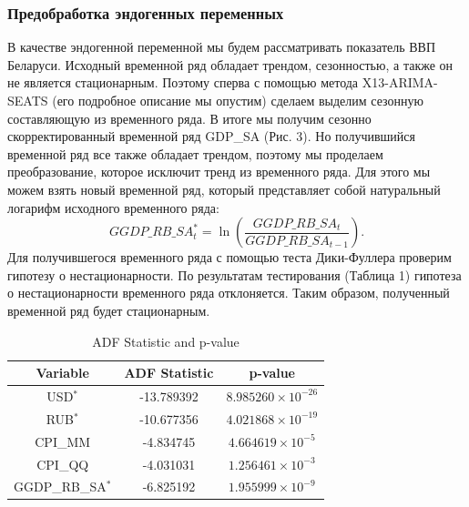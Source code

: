 \documentclass[a4paper, 12pt]{extarticle}
\numberwithin{equation}{subsection}
\begin{document}
	\subsubsection{Предобработка эндогенных переменных}
	В качестве эндогенной переменной мы будем рассматривать показатель ВВП Беларуси. Исходный временной ряд обладает трендом, сезонностью, а также он не является стационарным. Поэтому сперва с помощью метода X13-ARIMA-SEATS (его подробное описание мы опустим) сделаем выделим сезонную составляющую из временного ряда. В итоге мы получим сезонно скорректированный временной ряд GDP\_SA (Рис. 3). Но получившийся временной ряд все также обладает трендом, поэтому мы проделаем преобразование, которое исключит тренд из временного ряда. Для этого мы можем взять новый временной ряд, который представляет собой натуральный логарифм исходного временного ряда:
	\begin{equation}
		GGDP\_RB\_SA_t^* = \ln\left(\dfrac{GGDP\_RB\_SA_t}{GGDP\_RB\_SA_{t-1}}\right).
	\end{equation}
	Для получившегося временного ряда с помощью теста Дики-Фуллера проверим гипотезу о нестационарности. По результатам тестирования (Таблица 1) гипотеза о нестационарности временного ряда отклоняется. Таким образом, полученный временной ряд будет стационарным.
	\begin{table}[]
		\centering
		\caption{ADF Statistic and p-value}
		\label{tab:adf_pvalue}
		\begin{tabular}{|c|c|c|}
			\hline
			Variable   & ADF Statistic & p-value        \\ \hline
			USD$^*$       & -13.789392   & $8.985260 \times 10^{-26}$ \\
			RUB$^*$      & -10.677356   & $4.021868 \times 10^{-19}$ \\
			CPI\_MM    & -4.834745    & $4.664619 \times 10^{-5}$  \\
			CPI\_QQ    & -4.031031    & $1.256461 \times 10^{-3}$  \\
			GGDP\_RB\_SA$^*$ & -6.825192  & $1.955999 \times 10^{-9}$  \\ \hline
		\end{tabular}
	\end{table}
	\newpage
\end{document}
